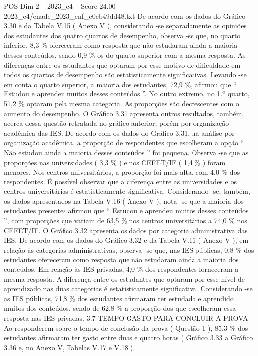 \begin{textsample}{POS Dim 2 – 2023\_c4 – Score 24.00 – 2023\_c4/enade\_2023\_enf\_e0eb49dd48.txt}
De acordo com os dados do Gráfico 3.30 e da Tabela V.15 ( Anexo V ), considerando -se separadamente as opiniões dos estudantes dos quatro quartos de desempenho, observa -se que, no quarto inferior, 8,3 \% ofereceram como resposta que não estudaram ainda a maioria desses conteúdos, sendo 0,9 \% os do quarto superior com a mesma resposta.
As diferenças entre os estudantes que optaram por esse motivo de dificuldade em todos os quartos de desempenho são estatisticamente significativas.
Levando -se em conta o quarto superior, a maioria dos estudantes, 72,9 \%, afirmou que “ Estudou e aprendeu muitos desses conteúdos ”.
No outro extremo, no 1.º quarto, 51,2 \% optaram pela mesma categoria.
As proporções são decrescentes com o aumento do desempenho.
O Gráfico 3.31 apresenta outros resultados, também, acerca dessa questão retratada no gráfico anterior, porém por organização acadêmica das IES.
De acordo com os dados do Gráfico 3.31, na análise por organização acadêmica, a proporção de respondentes que escolheram a opção “ Não estudou ainda a maioria desses conteúdos ” foi pequena.
Observa -se que as proporções nas universidades ( 3,3 \% ) e nos CEFET/IF ( 1,4 \% ) foram menores.
Nos centros universitários, a proporção foi mais alta, com 4,0 \% dos respondentes.
É possível observar que a diferença entre as universidades e os centros universitários é estatisticamente significativa.
Considerando -se, também, os dados apresentados na Tabela V.16 ( Anexo V ), nota -se que a maioria dos estudantes presentes afirmou que “ Estudou e aprendeu muitos desses conteúdos ”, com proporções que variam de 63,5 \% nos centros universitários a 74,0 \% nos CEFET/IF.
O Gráfico 3.32 apresenta os dados por categoria administrativa das IES.
De acordo com os dados do Gráfico 3.32 e da Tabela V.16 ( Anexo V ), em relação às categorias administrativas, observa -se que, nas IES públicas, 0,8 \% dos estudantes ofereceram como resposta que não estudaram ainda a maioria dos conteúdos.
Em relação às IES privadas, 4,0 \% dos respondentes forneceram a mesma resposta.
A diferença entre os estudantes que optaram por esse nível de aprendizado nas duas categorias é estatisticamente significativa.
Considerando -se as IES públicas, 71,8 \% dos estudantes afirmaram ter estudado e aprendido muitos dos conteúdos, sendo de 62,8 \% a proporção dos que escolheram essa resposta nas IES privadas. 3.7 TEMPO GASTO PARA CONCLUIR A PROVA Ao responderem sobre o tempo de conclusão da prova ( Questão 1 ), 85,3 \% dos estudantes afirmaram ter gasto entre duas e quatro horas ( Gráfico 3.33 a Gráfico 3.36 e, no Anexo V, Tabelas V.17 e V.18 ).

\end{textsample}
